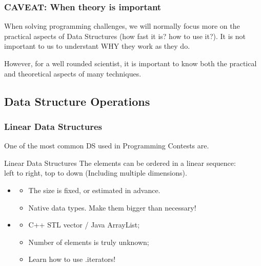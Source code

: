 \documentclass{beamer}
\begin{document}
\begin{frame}
  \frametitle{CAVEAT: When theory is important}
  When solving programming challenges, we will normally focus more on
  the practical aspects of Data Structures (how fast it is? how to use
  it?). It is not important to us to understant WHY they work as they do.

  \bigskip

  However, for a well rounded scientist, it is important to know both
  the practical and theoretical aspects of many techniques.
\end{frame}

\subsection{Data Structure Operations}
\begin{frame}
  \frametitle{Linear Data Structures} 

  {\small
  One of the most common DS used in Programming Contests are. 

  \begin{block}{Linear Data Structures}
    The elements can be ordered in a linear sequence:\\
    left to right, top to down (Including multiple dimensions).
  \end{block}

  \begin{itemize}
  \item {} 
    \begin{itemize} 
    \item The size is fixed, or estimated in advance. 
    \item Native data types. Make them bigger than necessary!
    \end{itemize}
    
  \item {}
    \begin{itemize}
    \item C++ STL vector / Java ArrayList;
    \item Number of elements is truly unknown;
    \item Learn how to use .iterators!
    \end{itemize}
  \end{itemize}
  }
\end{frame}
\end{document}
